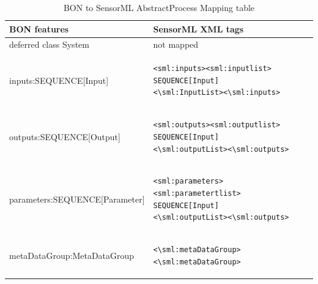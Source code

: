 \documentclass[]{final_report}
\begin{document}
\begin{table}[!th]
\centering
\begin{tabular}{|l|l|}
\hline
BON features & SensorML XML tags\\
\hline
   deferred class System  & not mapped\\
\hline     
     inputs:SEQUENCE[Input] & \begin{lstlisting}
<sml:inputs><sml:inputlist>
SEQUENCE[Input]
<\sml:InputList><\sml:inputs>\end{lstlisting}\\

\hline 
     outputs:SEQUENCE[Output] & \begin{lstlisting}
<sml:outputs><sml:outputlist>
SEQUENCE[Input]
<\sml:outputList><\sml:outputs>\end{lstlisting}\\
\hline
     parameters:SEQUENCE[Parameter] & \begin{lstlisting}
<sml:parameters><sml:parametertlist>
SEQUENCE[Input]
<\sml:outputList><\sml:outputs>\end{lstlisting}\\

\hline                 
     metaDataGroup:MetaDataGroup &  \begin{lstlisting}
<\sml:metaDataGroup><\sml:metaDataGroup>\end{lstlisting}\\
 \hline    

\end{tabular}
\caption{BON to SensorML AbstractProcess Mapping table}\label{table:bon_sml_example}
\label{ex:table}
\end{table}
\end{document}
